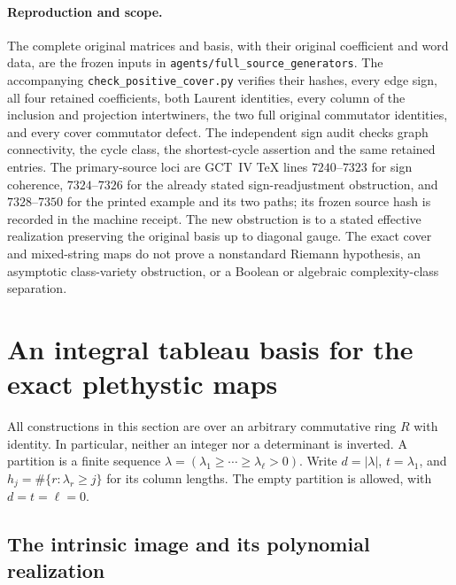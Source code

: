 \paragraph{Reproduction and scope.}
The complete original matrices and basis, with their original
coefficient and word data, are the frozen inputs in
\texttt{agents/full\_source\_generators}. The accompanying
\texttt{check\_positive\_cover.py} verifies their hashes, every edge
sign, all four retained coefficients, both Laurent identities, every
column of the inclusion and projection intertwiners, the two full
original commutator identities, and every cover commutator defect.
The independent sign audit checks graph connectivity, the cycle
class, the shortest-cycle assertion and the same retained entries.
The primary-source loci are GCT~IV TeX lines $7240$--$7323$
for sign coherence, $7324$--$7326$ for the already stated
sign-readjustment obstruction, and $7328$--$7350$ for the printed
example and its two paths; its frozen source hash is recorded in
the machine receipt. The new obstruction is to a stated effective
realization preserving the original basis up to diagonal gauge.
The exact cover and mixed-string maps do not prove a nonstandard
Riemann hypothesis, an asymptotic class-variety obstruction, or a
Boolean or algebraic complexity-class separation.

\section{An integral tableau basis for the exact plethystic maps}
\label{sec:plethysm-integral-tableau-basis}

All constructions in this section are over an arbitrary commutative ring
$R$ with identity. In particular, neither an integer nor a determinant
is inverted. A partition is a finite sequence
$\lambda=(\lambda_1\geq\cdots\geq\lambda_\ell>0)$.
Write $d=|\lambda|$, $t=\lambda_1$, and
$h_j=\#\{r:\lambda_r\geq j\}$ for its column lengths.
The empty partition is allowed, with $d=t=\ell=0$.

\subsection{The intrinsic image and its polynomial realization}

